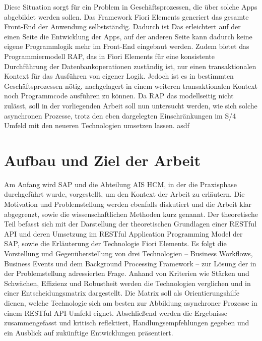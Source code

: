 Diese Situation sorgt für ein Problem in Geschäftsprozessen, die über solche Apps abgebildet werden sollen. Das Framework Fiori Elements generiert das gesamte Front-End der Anwendung selbstständig. Dadurch ist Das erleichtert auf der einen Seite die Entwicklung der Apps, auf der anderen Seite kann dadurch keine eigene Programmlogik mehr im Front-End eingebaut werden. Zudem bietet das Programmiermodell RAP, das in Fiori Elements für eine konsistente Durchführung der Datenbankoperationen zuständig ist, nur einen transaktionalen Kontext für das Ausführen von eigener Logik. Jedoch ist es in bestimmten Geschäftsprozessen nötig, nachgelagert in einem weiteren transaktionalen Kontext noch Programmcode ausführen zu können. Da RAP das modellseitig nicht zulässt, soll in der vorliegenden Arbeit soll nun untersucht werden, wie sich solche asynchronen Prozesse, trotz den eben dargelegten Einschränkungen im S/4 Umfeld mit den neueren Technologien umsetzen lassen. asdf


\section{Aufbau und Ziel der Arbeit}

Am Anfang wird SAP und die Abteilung AIS HCM, in der die Praxisphase durchgeführt wurde, vorgestellt, um den Kontext der Arbeit zu erläutern. Die Motivation und Problemstellung werden ebenfalls diskutiert und die Arbeit klar abgegrenzt, sowie die wissenschaftlichen Methoden kurz genannt. Der theoretische Teil befasst sich mit der Darstellung der theoretischen Grundlagen einer RESTful API und deren Umsetzung im RESTful Application Programming Model der SAP, sowie die Erläuterung der Technologie Fiori Elements. Es folgt die Vorstellung und Gegenüberstellung von drei Technologien – Business Workflows, Business Events und dem Background Processing Framework – zur Lösung der in der Problemstellung adressierten Frage. Anhand von Kriterien wie Stärken und Schwächen, Effizienz und Robustheit werden die Technologien verglichen und in einer Entscheidungsmatrix dargestellt. Die Matrix soll als Orientierungshilfe dienen, welche Technologie sich am besten zur Abbildung asynchroner Prozesse in einem RESTful API-Umfeld eignet. Abschließend werden die Ergebnisse zusammengefasst und kritisch reflektiert, Handlungsempfehlungen gegeben und ein Ausblick auf zukünftige Entwicklungen präsentiert.

